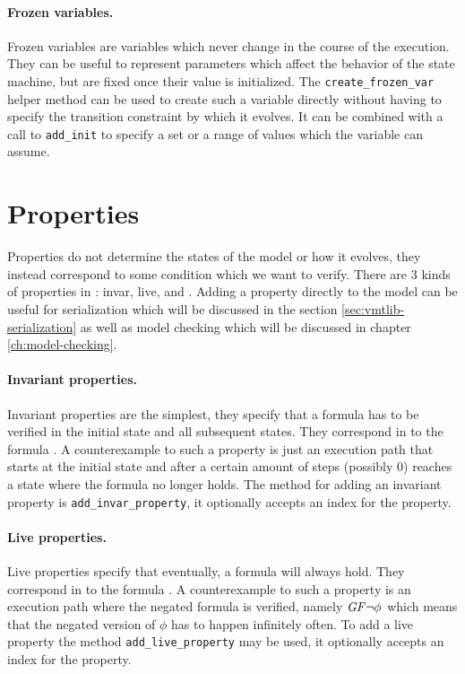 \paragraph*{Frozen variables.}
Frozen variables are variables which never change in the course of the execution.
They can be useful to represent parameters which affect the behavior of the state machine, but are fixed once their value is initialized.
The \texttt{create\_frozen\_var} helper method can be used to create such a variable directly without having to specify the transition constraint by which it evolves. It can be combined with a call to \texttt{add\_init} to specify a set or a range of values which the variable can assume.

\section{Properties}
Properties do not determine the states of the model or how it evolves, they instead correspond to some condition which we want to verify.
There are 3 kinds of properties in \pyvmt{}: invar, live, and \ltl{}.
Adding a property directly to the model can be useful for serialization which will be discussed in the section \ref{sec:vmtlib-serialization} as well as model checking which will be discussed in chapter \ref{ch:model-checking}.

\paragraph*{Invariant properties.}
Invariant properties are the simplest, they specify that a formula has to be verified in the initial state and all subsequent states.
They correspond in \ltl{} to the formula \fsafe{}.
A counterexample to such a property is just an execution path that starts at the initial state and after a certain amount of steps (possibly 0) reaches a state where the formula no longer holds.
The method for adding an invariant property is \texttt{add\_invar\_property}, it optionally accepts an index for the property.

\paragraph*{Live properties.}
Live properties specify that eventually, a formula will always hold.
They correspond in \ltl{} to the formula \flive{}.
A counterexample to such a property is an execution path where the negated formula is verified, namely $\mathit{G} \mathit{F} \lnot \phi$ which means that the negated version of $\phi$ has to happen infinitely often.
To add a live property the method \texttt{add\_live\_property} may be used, it optionally accepts an index for the property.

